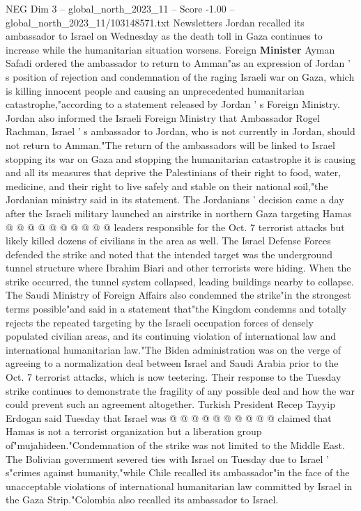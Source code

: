 \begin{textsample}{NEG Dim 3 – global\_north\_2023\_11 – Score -1.00 – global\_north\_2023\_11/103148571.txt}  \label{ex:f3_neg_289}
Newsletters Jordan recalled its ambassador to Israel on Wednesday as the death toll in Gaza continues to increase while the humanitarian situation worsens.
Foreign \textbf{Minister} Ayman Safadi ordered the ambassador to return to Amman"as an expression of Jordan ' s position of rejection and condemnation of the raging Israeli war on Gaza, which is killing innocent people and causing an unprecedented humanitarian catastrophe,"according to a statement released by Jordan ' s Foreign Ministry.
Jordan also informed the Israeli Foreign Ministry that Ambassador Rogel Rachman, Israel ' s ambassador to Jordan, who is not currently in Jordan, should not return to Amman."The return of the ambassadors will be linked to Israel stopping its war on Gaza and stopping the humanitarian catastrophe it is causing and all its measures that deprive the Palestinians of their right to food, water, medicine, and their right to live safely and stable on their national soil,"the Jordanian ministry said in its statement.
The Jordanians ' decision came a day after the Israeli military launched an airstrike in northern Gaza targeting Hamas @ @ @ @ @ @ @ @ @ @ leaders responsible for the Oct. 7 terrorist attacks but likely killed dozens of civilians in the area as well.
The Israel Defense Forces defended the strike and noted that the intended target was the underground tunnel structure where Ibrahim Biari and other terrorists were hiding.
When the strike occurred, the tunnel system collapsed, leading buildings nearby to collapse.
The Saudi Ministry of Foreign Affairs also condemned the strike"in the strongest terms possible"and said in a statement that"the Kingdom condemns and totally rejects the repeated targeting by the Israeli occupation forces of densely populated civilian areas, and its continuing violation of international law and international humanitarian law."The Biden administration was on the verge of agreeing to a normalization deal between Israel and Saudi Arabia prior to the Oct. 7 terrorist attacks, which is now teetering.
Their response to the Tuesday strike continues to demonstrate the fragility of any possible deal and how the war could prevent such an agreement altogether.
Turkish President Recep Tayyip Erdogan said Tuesday that Israel was @ @ @ @ @ @ @ @ @ @ claimed that Hamas is not a terrorist organization but a liberation group of"mujahideen."Condemnation of the strike was not limited to the Middle East.
The Bolivian government severed ties with Israel on Tuesday due to Israel ' s"crimes against humanity,"while Chile recalled its ambassador"in the face of the unacceptable violations of international humanitarian law committed by Israel in the Gaza Strip."Colombia also recalled its ambassador to Israel.

\end{textsample}

